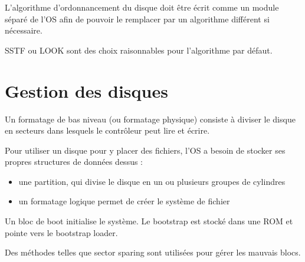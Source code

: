 	L'algorithme d'ordonnancement du disque doit être écrit comme un module séparé de l'OS afin de pouvoir le remplacer par un algorithme différent si nécessaire.
	
	SSTF ou LOOK sont des choix raisonnables pour l'algorithme par défaut.
	
	
\section{Gestion des disques}

Un formatage de bas niveau (ou formatage physique) consiste à diviser le disque en secteurs dans lesquels le contrôleur peut lire et écrire.

Pour utiliser un disque pour y placer des fichiers, l'OS a besoin de stocker ses propres structures de données dessus :

\begin{itemize}
	\item une partition, qui divise le disque en un ou plusieurs groupes de cylindres
	\item un formatage logique permet de créer le système de fichier
\end{itemize}

Un bloc de boot initialise le système. Le bootstrap est stocké dans une ROM et pointe vers le bootstrap loader.

Des méthodes telles que sector sparing sont utilisées pour gérer les mauvais blocs.

